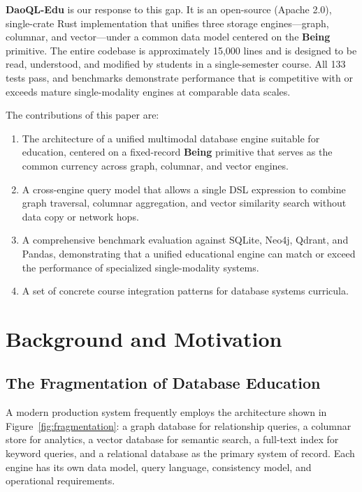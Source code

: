 \documentclass[11pt,a4paper]{article}
\begin{document}
\textbf{DaoQL-Edu} is our response to this gap. It is an open-source
(Apache 2.0), single-crate Rust implementation that unifies three storage
engines---graph, columnar, and vector---under a common data model centered
on the \textbf{Being} primitive. The entire codebase is approximately 15,000
lines and is designed to be read, understood, and modified by students in a
single-semester course. All 133 tests pass, and benchmarks demonstrate
performance that is competitive with or exceeds mature single-modality
engines at comparable data scales.

The contributions of this paper are:

\begin{enumerate}[leftmargin=*,nosep]
\item The architecture of a unified multimodal database engine suitable for
  education, centered on a fixed-record \textbf{Being} primitive that serves
  as the common currency across graph, columnar, and vector engines.
\item A cross-engine query model that allows a single DSL expression to
  combine graph traversal, columnar aggregation, and vector similarity
  search without data copy or network hops.
\item A comprehensive benchmark evaluation against SQLite, Neo4j, Qdrant,
  and Pandas, demonstrating that a unified educational engine can match or
  exceed the performance of specialized single-modality systems.
\item A set of concrete course integration patterns for database systems
  curricula.
\end{enumerate}

\section{Background and Motivation}

\subsection{The Fragmentation of Database Education}

A modern production system frequently employs the architecture shown in
Figure~\ref{fig:fragmentation}: a graph database for relationship queries, a
columnar store for analytics, a vector database for semantic search, a
full-text index for keyword queries, and a relational database as the
primary system of record. Each engine has its own data model, query
language, consistency model, and operational requirements.
\end{document}
